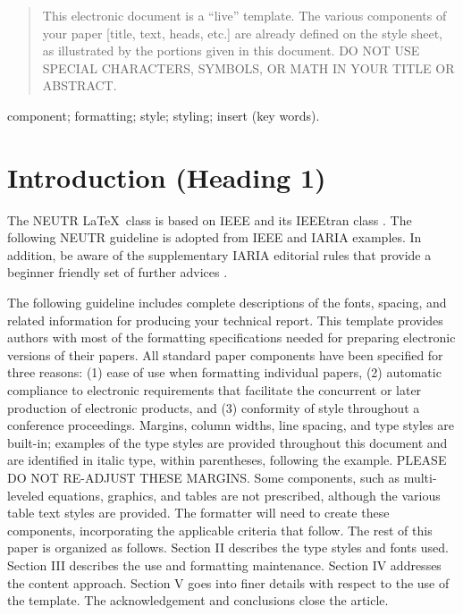 \documentclass[conference,a4paper,flushend]{neutr}
\begin{document}
\selectlanguage{\NeutrLang}

\maketitle

\begin{abstract}
    This electronic document is a “live” template. The various components of your paper [title, text, heads, etc.] are already defined on the style sheet, as illustrated by the portions given in this document. DO NOT USE SPECIAL CHARACTERS, SYMBOLS, OR MATH IN YOUR TITLE OR ABSTRACT.
\end{abstract}

\begin{IEEEkeywords}
component; formatting; style; styling; insert (key words).
\end{IEEEkeywords}

\section{Introduction (Heading 1)}
The NEUTR \LaTeX\ class is based on IEEE \faStar{} and its IEEEtran class \cite{ieee2015howto}.
The following NEUTR guideline is adopted from IEEE \cite{ieee2018formattingrules} and IARIA \cite{iaria2014formattingrules} examples.
In addition, be aware of the supplementary IARIA editorial rules \faWarning{} that provide a beginner friendly set of further advices \cite{iaria2009editorialrules}.

The following guideline includes complete descriptions of the fonts, spacing, and related information for producing your technical report.
%
This template provides authors with most of the formatting specifications needed for preparing electronic versions of their papers. All standard paper components have been specified for three reasons: (1) ease of use when formatting individual papers, (2) automatic compliance to electronic requirements that facilitate the concurrent or later production of electronic products, and (3) conformity of style throughout a conference proceedings. Margins, column widths, line spacing, and type styles are built-in; examples of the type styles are provided throughout this document and are identified in italic type, within parentheses, following the example. PLEASE DO NOT RE-ADJUST THESE MARGINS. Some components, such as multi-leveled equations, graphics, and tables are not prescribed, although the various table text styles are provided. The formatter will need to create these components, incorporating the applicable criteria that follow. The rest of this paper is organized as follows. Section II describes the type styles and fonts used. Section III describes the use and formatting maintenance. Section IV addresses the content approach. Section V goes into finer details with respect to the use of the template.  The acknowledgement and conclusions close the article.
\end{document}
